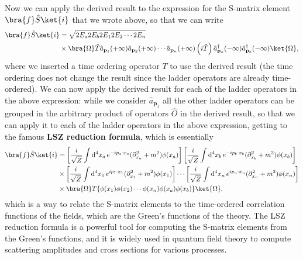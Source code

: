 Now we can apply the derived result to the expression for the S-matrix element \(\bra{f} \hat{S} \ket{i}\) that we wrote above, so that we can write
\[
    \begin{aligned}
        \bra{f} \hat{S} \ket{i} & = \sqrt{2E_a 2E_b 2E_1 2E_2 \cdots 2E_n}                                                                                                                                                                                                                    \\
                                & \times \bra{\Omega} \hat{T} \hat{a}_{\mathbf{p}_1}(+\infty) \hat{a}_{\mathbf{p}_2}(+\infty) \cdots \hat{a}_{\mathbf{p}_n}(+\infty) \left(i \hat{T}\right) \hat{a}^{\dagger}_{\mathbf{p}_a}(-\infty) \hat{a}^{\dagger}_{\mathbf{p}_b}(-\infty) \ket{\Omega},
    \end{aligned}
\]
where we inserted a time ordering operator \(T\) to use the derived result (the time ordering does not change the result since the ladder operators are already time-ordered). We can now apply the derived result for each of the ladder operators in the above expression: while we consider \(\hat{a}_{\mathbf{p}_1}\) all the other ladder operators can be grouped in the arbitrary product of operators \(\hat{O}\) in the derived result, so that we can apply it to each of the ladder operators in the above expression, getting to the famous \textbf{LSZ reduction formula}, which is essentially
\begin{equation}
    \begin{aligned}
        \bra{f} \hat{S} \ket{i} & = \left[ \frac{i}{\sqrt{Z}} \int \mathrm{d}^4 x_a \, e^{-ip_a \cdot x_a} (\partial_{x_a}^2 + m^2) \phi(x_a) \right] \left[ \frac{i}{\sqrt{Z}} \int \mathrm{d}^4 x_b \, e^{-ip_b \cdot x_b} (\partial_{x_b}^2 + m^2) \phi(x_b) \right]             \\
                                & \times \left[ \frac{i}{\sqrt{Z}} \int \mathrm{d}^4 x_1 \, e^{ip_1 \cdot x_1} (\partial_{x_1}^2 + m^2) \phi(x_1) \right] \cdots \left[ \frac{i}{\sqrt{Z}} \int \mathrm{d}^4 x_n \, e^{ip_n \cdot x_n} (\partial_{x_n}^2 + m^2) 	\phi(x_n) 	\right] \\
                                & \times \bra{\Omega} T\{\phi(x_1)\phi(x_2)\cdots\phi(x_n) \phi(x_a)\phi(x_b)\}\ket{\Omega},
    \end{aligned}
    \label{eq:LSZ_reduction_formula_position_space}
\end{equation}
which is a way to relate the S-matrix elements to the time-ordered correlation functions of the fields, which are the Green's functions of the theory. The LSZ reduction formula is a powerful tool for computing the S-matrix elements from the Green's functions, and it is widely used in quantum field theory to compute scattering amplitudes and cross sections for various processes.

